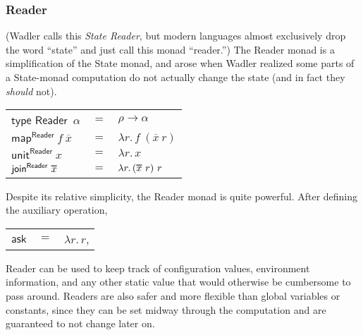 \documentclass[acmsmall, nonacm, screen]{acmart}
\newcommand\doverline[1]{%
  \setbox0=\hbox{$\overline{#1}$}%
  \ht0=\dimexpr\ht0-.30ex\relax%
  \overline{\copy0}%
}
\newcommand{\lambdaE}[2]{\lambda #1.\, #2}
\newcommand{\map}[3]{\textsf{map}^{\textsf{#1}}~#2~#3}
\newcommand{\unit}[2]{\textsf{unit}^{\textsf{#1}}~#2}
\newcommand{\join}[2]{\textsf{join}^{\textsf{#1}}~#2}
\begin{document}
\subsubsection{Reader}
(Wadler calls this {\em State Reader}, but modern languages almost exclusively drop the word
``state'' and just call this monad ``reader.'') The \textsf{Reader} monad is a simplification of
the \textsf{State} monad, and arose when Wadler realized some parts of a \textsf{State}-monad
computation do not actually change the state (and in fact they {\em should} not).
\begin{center}
  \begin{tabular}{lll}
    $\textsf{type Reader}$~$\alpha$ & $=$ & $\rho \to \alpha$ \\
    $\map{Reader}{f}{\overline{x}}$ & $=$ & $\lambdaE{r}{f~(\overline{x}~r)}$ \\
    $\unit{Reader}{x}$ & $=$ & $\lambdaE{r}{x}$ \\
    $\join{Reader}{\doverline{x}}$ & $=$ & $\lambdaE{r}{(\doverline{x}~r)~r}$
  \end{tabular}
\end{center}
Despite its relative simplicity, the \textsf{Reader} monad is quite powerful. After defining the
auxiliary operation,
\begin{center}
  \begin{tabular}{lll}
    $\textsf{ask}$ & $=$ & $\lambdaE{r}{r}$,
  \end{tabular}
\end{center}
\textsf{Reader} can be used to keep track of configuration values, environment information, and
any other static value that would otherwise be cumbersome to pass around. Readers are also safer
and more flexible than global variables or constants, since they can be set midway through the
computation and are guaranteed to not change later on.
\end{document}
